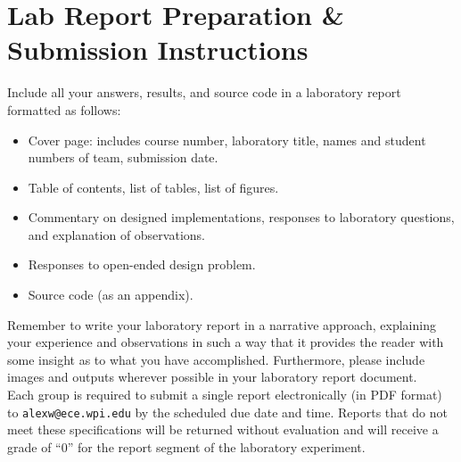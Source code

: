 \documentclass[letterpaper,12pt]{article}
\begin{document}
\section{Lab Report Preparation \& Submission Instructions}
Include all your answers, results, and source code in a laboratory
report formatted as follows:
\begin{itemize}
 \item Cover page: includes course number, laboratory title, names and student numbers of team, submission
 date.
 \item Table of contents, list of tables, list of figures.
 \item Commentary on designed implementations, responses to laboratory questions, and explanation of
 observations.
 \item Responses to open-ended design problem.
 \item Source code (as an appendix).
\end{itemize}

Remember to write your laboratory report in a narrative approach, explaining your experience and observations in such a way that it provides the reader with some insight as to what you have accomplished.  Furthermore, please include images and outputs wherever possible in your laboratory report document.\\

\noindent Each group is required to submit a single report
electronically (in PDF format) to \texttt{alexw@ece.wpi.edu} by the scheduled due date and time.
Reports that do not meet these specifications will be returned
without evaluation and will receive a grade of ``0'' for the report
segment of the laboratory experiment.


\newpage


\end{document}
